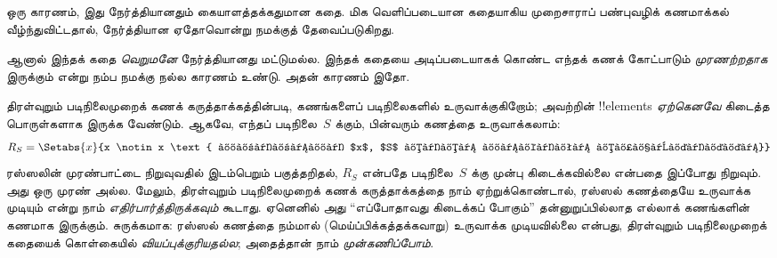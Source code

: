 \documentclass[../../../include/open-logic-section]{subfiles}
\begin{document}
ஒரு காரணம், இது நேர்த்தியானதும் கையாளத்தக்கதுமான கதை. மிக வெளிப்படையான
கதையாகிய முறைசாராப் பண்புவழிக் கணமாக்கல் வீழ்ந்துவிட்டதால், நேர்த்தியான
ஏதோவொன்று நமக்குத் தேவைப்படுகிறது.

ஆனால் இந்தக் கதை \emph{வெறுமனே} நேர்த்தியானது மட்டுமல்ல. இந்தக் கதையை
அடிப்படையாகக் கொண்ட எந்தக் கணக் கோட்பாடும் \emph{முரணற்றதாக} இருக்கும்
என்று நம்ப நமக்கு நல்ல காரணம் உண்டு. அதன் காரணம் இதோ.

திரள்வுறும் படிநிலைமுறைக் கணக் கருத்தாக்கத்தின்படி, கணங்களைப்
படிநிலைகளில் உருவாக்குகிறோம்; அவற்றின் !!{element}s \emph{ஏற்கெனவே}
கிடைத்த பொருள்களாக இருக்க வேண்டும். ஆகவே, எந்தப் படிநிலை~$S$ க்கும்,
பின்வரும் கணத்தை உருவாக்கலாம்:
\[
	R_S = \Setabs{x}{x \notin x \text{ மற்றும் $x$, $S$ க்கு முன்பு கிடைத்தது}}
\]
ரஸ்ஸலின் முரண்பாட்டை நிறுவுவதில் இடம்பெறும் பகுத்தறிதல், $R_S$ என்பதே
படிநிலை~$S$ க்கு முன்பு கிடைக்கவில்லை என்பதை இப்போது நிறுவும். அது ஒரு
முரண் அல்ல. மேலும், திரள்வுறும் படிநிலைமுறைக் கணக் கருத்தாக்கத்தை நாம்
ஏற்றுக்கொண்டால், ரஸ்ஸல் கணத்தையே உருவாக்க முடியும் என்று நாம்
\emph{எதிர்பார்த்திருக்கவும்} கூடாது. ஏனெனில் அது “எப்போதாவது கிடைக்கப்
போகும்” தன்னுறுப்பில்லாத எல்லாக் கணங்களின் கணமாக இருக்கும். சுருக்கமாக:
ரஸ்ஸல் கணத்தை நம்மால் (மெய்ப்பிக்கத்தக்கவாறு) உருவாக்க முடியவில்லை என்பது,
திரள்வுறும் படிநிலைமுறைக் கதையைக் கொள்கையில் \emph{வியப்புக்குரியதல்ல};
அதைத்தான் நாம் \emph{முன்கணிப்போம்}.

%

\end{document}
